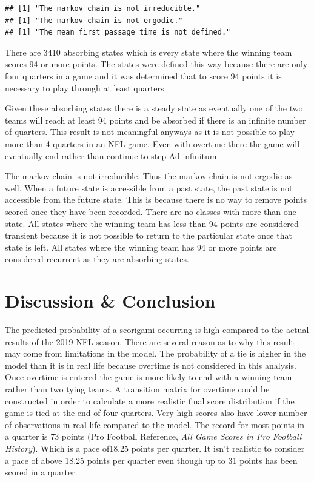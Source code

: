 \documentclass[
]{article}
\begin{document}
\begin{verbatim}
## [1] "The markov chain is not irreducible."
## [1] "The markov chain is not ergodic."
## [1] "The mean first passage time is not defined."
\end{verbatim}

There are 3410 absorbing states which is every state where the winning
team scores 94 or more points. The states were defined this way because
there are only four quarters in a game and it was determined that to
score 94 points it is necessary to play through at least quarters.

Given these absorbing states there is a steady state as eventually one
of the two teams will reach at least 94 points and be absorbed if there
is an infinite number of quarters. This result is not meaningful anyways
as it is not possible to play more than 4 quarters in an NFL game. Even
with overtime there the game will eventually end rather than continue to
step Ad infinitum.

The markov chain is not irreducible. Thus the markov chain is not
ergodic as well. When a future state is accessible from a past state,
the past state is not accessible from the future state. This is because
there is no way to remove points scored once they have been recorded.
There are no classes with more than one state. All states where the
winning team has less than 94 points are considered transient because it
is not possible to return to the particular state once that state is
left. All states where the winning team has 94 or more points are
considered recurrent as they are absorbing states.

\hypertarget{discussion-conclusion}{%
\section{Discussion \& Conclusion}\label{discussion-conclusion}}

The predicted probability of a scorigami occurring is high compared to
the actual results of the 2019 NFL season. There are several reason as
to why this result may come from limitations in the model. The
probability of a tie is higher in the model than it is in real life
because overtime is not considered in this analysis. Once overtime is
entered the game is more likely to end with a winning team rather than
two tying teams. A transition matrix for overtime could be constructed
in order to calculate a more realistic final score distribution if the
game is tied at the end of four quarters. Very high scores also have
lower number of observations in real life compared to the model. The
record for most points in a quarter is 73 points (Pro Football
Reference, \emph{All Game Scores in Pro Football History}). Which is a
pace of18.25 points per quarter. It isn't realistic to consider a pace
of above 18.25 points per quarter even though up to 31 points has been
scored in a quarter.
\end{document}
